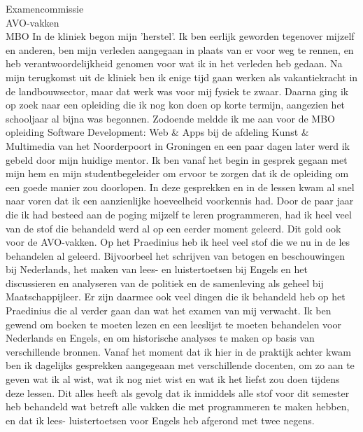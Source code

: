 \documentclass{letter}
\begin{document}
\begin{letter}{Examencommissie \\ AVO-vakken \\ MBO}
In de kliniek begon mijn 'herstel'. Ik ben eerlijk geworden tegenover mijzelf en anderen, ben mijn 
verleden aangegaan in plaats van er voor weg te rennen, en heb verantwoordelijkheid genomen voor 
wat ik in het verleden heb gedaan. Na mijn terugkomst uit de kliniek ben ik enige tijd  gaan werken 
als vakantiekracht in de landbouwsector, maar dat werk was voor mij fysiek te zwaar.
Daarna ging ik op zoek naar een opleiding die ik nog kon doen op korte termijn, aangezien het schooljaar
al bijna was begonnen. Zodoende meldde ik me aan voor de MBO opleiding Software Development: Web \& Apps 
bij de afdeling Kunst \& Multimedia van het Noorderpoort in Groningen en een paar dagen later werd ik gebeld 
door mijn huidige mentor. Ik ben vanaf het begin in gesprek gegaan met mijn hem en  mijn studentbegeleider 
om ervoor te zorgen dat ik de opleiding om een goede manier zou doorlopen. In deze gesprekken en in de lessen kwam 
al snel naar voren dat ik een aanzienlijke hoeveelheid voorkennis had. Door de paar jaar die ik had besteed aan
de poging mijzelf te leren programmeren, had ik heel veel van de stof die behandeld werd al op een eerder moment 
geleerd. Dit gold ook voor de AVO-vakken. Op het Praedinius heb ik heel veel stof die we nu in de les behandelen
al geleerd. Bijvoorbeel het schrijven van betogen en beschouwingen bij Nederlands, het maken van lees- en luistertoetsen
bij Engels en het discussieren en analyseren van de politiek en de samenleving als geheel bij Maatschappijleer.
Er zijn daarmee ook veel dingen die ik behandeld heb op het Praedinius die al verder gaan dan wat het examen
van mij verwacht. Ik ben gewend om boeken te moeten lezen en een leeslijst te moeten behandelen voor Nederlands
en Engels, en om historische analyses te maken op basis van verschillende bronnen. Vanaf het moment dat ik 
hier in de praktijk achter kwam ben ik dagelijks gesprekken aangegeaan met verschillende docenten, om zo aan 
te geven wat ik al wist, wat ik nog niet wist en wat ik het liefst zou doen tijdens deze lessen. 
Dit alles heeft als gevolg dat ik inmiddels alle stof voor dit semester heb behandeld wat betreft alle 
vakken die met programmeren te maken hebben, en dat ik lees- luistertoetsen voor Engels heb afgerond met twee 
negens. 


\end{letter}
\end{document}
